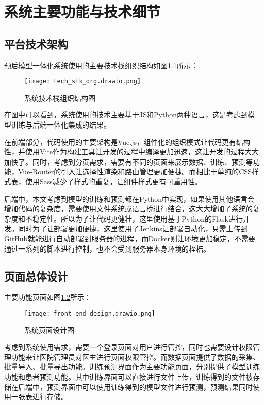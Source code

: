 \chapter{系统主要功能与技术细节}
\label{cha:sys}

\section{平台技术架构}

预后模型一体化系统使用的主要技术栈组织结构如图\ref{fig:tech_stk_org}所示：

\begin{figure}[!htbp]
    \centering
    \texttt{[image: tech\_stk\_org.drawio.png]}
    \caption{系统技术栈组织结构图} \label{fig:tech_stk_org}
\end{figure}

在图中可以看到，系统使用的技术主要基于JS和Python两种语言，这是考虑到模型训练与后端一体化集成的结果。

在前端部分，代码使用的主要架构是Vue.js，组件化的组织模式让代码更有结构性，并使用Vite作为构建工具让开发的过程中编译更加迅速，这让开发的过程大大加快了。同时，考虑到分页需求，需要有不同的页面来展示数据、训练、预测等功能，Vue-Router的引入让选择性渲染和路由管理更加便捷。而相比于单纯的CSS样式表，使用Sass减少了样式的重复，让组件样式更有可重用性。

后端中，本文考虑到模型的训练和预测都在Python中实现，如果使用其他语言会增加代码的复杂度，需要使用文件系统或语言桥进行结合，这大大增加了系统的复杂度和不稳定性。所以为了让代码更健壮，这里使用基于Python的Flask进行开发。同时为了让部署更加便捷，这里使用了Jenkins让部署自动化，只需上传到GitHub就能进行自动部署到服务器的进程，而Docker则让环境更加稳定，不需要通过一系列的脚本进行控制，也不会受到服务器本身环境的桎梏。

\section{页面总体设计}

主要功能页面如图\ref{fig:pages_design}所示：

\begin{figure}[!htbp]
    \centering
    \texttt{[image: front\_end\_design.drawio.png]}
    \caption{系统页面设计图} \label{fig:pages_design}
\end{figure}

考虑到系统使用需求，需要一个登录页面对用户进行管控，同时也需要设计权限管理功能来让医院管理员对医生进行页面权限管控。而数据页面提供了数据的采集、批量导入、批量导出功能。训练预测界面作为主要功能页面，分别提供了模型训练功能和患者预测功能。其中训练界面可以直接进行文件上传，训练得到的文件被存储在后端中，预测界面中可以使用训练得到的模型文件进行预测，预测结果同时使用一张表进行存储。

